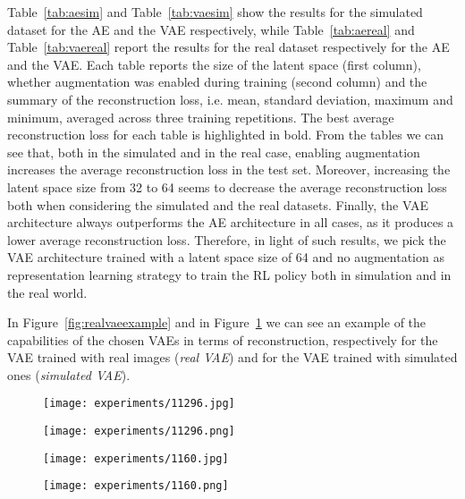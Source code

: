 Table~\ref{tab:aesim} and Table~\ref{tab:vaesim} show the results for the simulated dataset for the AE and the VAE respectively, while Table~\ref{tab:aereal} and Table~\ref{tab:vaereal} report the results for the real dataset respectively for the AE and the VAE. Each table reports the size of the latent space (first column), whether augmentation was enabled during training (second column) and the summary of the reconstruction loss, i.e. mean, standard deviation, maximum and minimum, averaged across three training repetitions. The best average reconstruction loss for each table is highlighted in bold. From the tables we can see that, both in the simulated and in the real case, enabling augmentation increases the average reconstruction loss in the test set. Moreover, increasing the latent space size from 32 to 64 seems to decrease the average reconstruction loss both when considering the simulated and the real datasets. Finally, the VAE architecture always outperforms the AE architecture in all cases, as it produces a lower average reconstruction loss. Therefore, in light of such results, we pick the VAE architecture trained with a latent space size of 64 and no augmentation as representation learning strategy to train the RL policy both in simulation and in the real world.

In Figure~\ref{fig:realvaeexample} and in Figure~\ref{fig:simvaeexample} we can see an example of the capabilities of the chosen VAEs in terms of reconstruction, respectively for the VAE trained with real images (\textit{real VAE}) and for the VAE trained with simulated ones (\textit{simulated VAE}).

\begin{figure}[h]
  \begin{minipage}{.50\textwidth}
    \centering
    \texttt{[image: experiments/11296.jpg]}
  \end{minipage}%
  \begin{minipage}{.50\textwidth}
      \centering
      \texttt{[image: experiments/11296.png]}
  \end{minipage}
  \label{fig:realvaeexample}
  \begin{minipage}{.50\textwidth}
    \centering
    \texttt{[image: experiments/1160.jpg]}
  \end{minipage}%
  \begin{minipage}{.50\textwidth}
      \centering
      \texttt{[image: experiments/1160.png]}
  \end{minipage}
  \label{fig:simvaeexample}
\end{figure}

